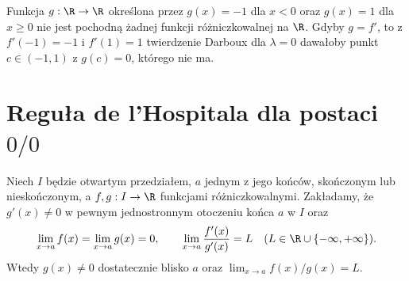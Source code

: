 \begin{przyklad}
\label{ma1:ex:darboux-step}
Funkcja $g:\R\to\R$ określona przez $g(x)=-1$ dla $x<0$ oraz $g(x)=1$ dla $x\ge0$ nie jest pochodną żadnej funkcji różniczkowalnej na $\R$. Gdyby $g=f'$, to z $f'(-1)=-1$ i $f'(1)=1$ twierdzenie Darboux dla $\lambda=0$ dawałoby punkt $c\in(-1,1)$ z $g(c)=0$, którego nie ma.
\end{przyklad}

\section{Reguła de l'Hospitala dla postaci $0/0$}
\begin{twierdzenie}
\label{ma1:thm:lhopital-zero}
Niech $I$ będzie otwartym przedziałem, $a$ jednym z jego końców, skończonym lub nieskończonym, a $f,g:I\to\R$ funkcjami różniczkowalnymi. Zakładamy, że $g'(x)\ne0$ w pewnym jednostronnym otoczeniu końca $a$ w $I$ oraz
\[
 \lim_{x\to a}f(x)=\lim_{x\to a}g(x)=0,\qquad
 \lim_{x\to a}\frac{f'(x)}{g'(x)}=L
 \quad (L\in\R\cup\{-\infty,+\infty\}).
\]
Wtedy $g(x)\ne0$ dostatecznie blisko $a$ oraz $\lim_{x\to a} f(x)/g(x)=L$.
\end{twierdzenie}

